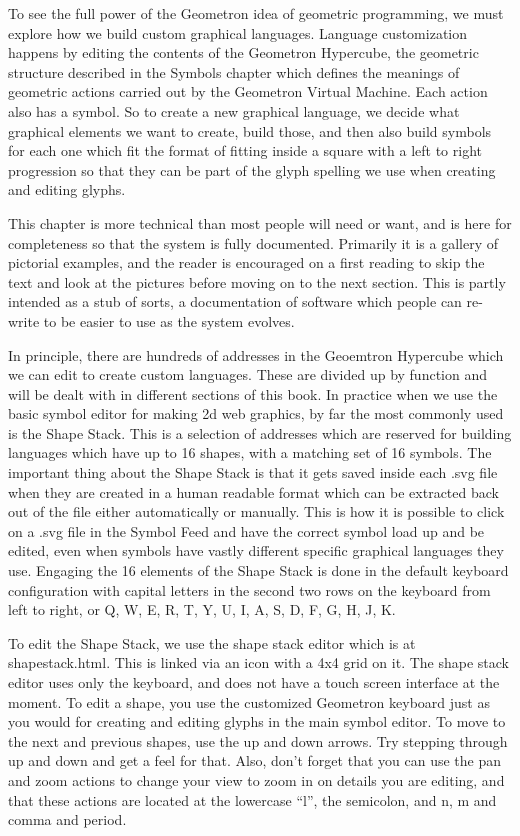 

To see the full power of the Geometron idea of geometric programming, we must explore how we build custom graphical languages.  Language customization happens by editing the contents of the Geometron Hypercube, the geometric structure described in the Symbols chapter which defines the meanings of geometric actions carried out by the Geometron Virtual Machine.  Each action also has a symbol.  So to create a new graphical language, we decide what graphical elements we want to create, build those, and then also build symbols for each one which fit the format of fitting inside a square with a left to right progression so that they can be part of the glyph spelling we use when creating and editing glyphs.

This chapter is more technical than most people will need or want, and is here for completeness so that the system is fully documented.  Primarily it is a gallery of pictorial examples, and the reader is encouraged on a first reading to skip the text and look at the pictures before moving on to the next section.  This is partly intended as a stub of sorts, a documentation of software which people can re-write to be easier to use as the system evolves.

In principle, there are hundreds of addresses in the Geoemtron Hypercube which we can edit to create custom languages.  These are divided up by function and will be dealt with in different sections of this book.  In practice when we use the basic symbol editor for making 2d web graphics, by far the most commonly used is the Shape Stack.  This is a selection of addresses which are reserved for building languages which have up to 16 shapes, with a matching set of 16 symbols.  The important thing about the Shape Stack is that it gets saved inside each .svg file when they are created in a human readable format which can be extracted back out of the file either automatically or manually.  This is how it is possible to click on a .svg file in the Symbol Feed and have the correct symbol load up and be edited, even when symbols have vastly different specific graphical languages they use.   Engaging the 16 elements of the Shape Stack is done in the default keyboard configuration with capital letters in the second two rows on the keyboard from left to right, or Q, W, E, R, T, Y, U, I, A, S, D, F, G, H, J, K.   

To edit the Shape Stack, we use the shape stack editor which is at shapestack.html.  This is linked via an icon with a 4x4 grid on it.  The shape stack editor uses only the keyboard, and does not have a touch screen interface at the moment.  To edit a shape, you use the customized Geometron keyboard just as you would for creating and editing glyphs in the main symbol editor.  To move to the next and previous shapes, use the up and down arrows.  Try stepping through up and down and get a feel for that.  Also, don't forget that you can use the pan and zoom actions to change your view to zoom in on details you are editing, and that these actions are located at the lowercase ``l'', the semicolon, and n, m and comma and period. 

